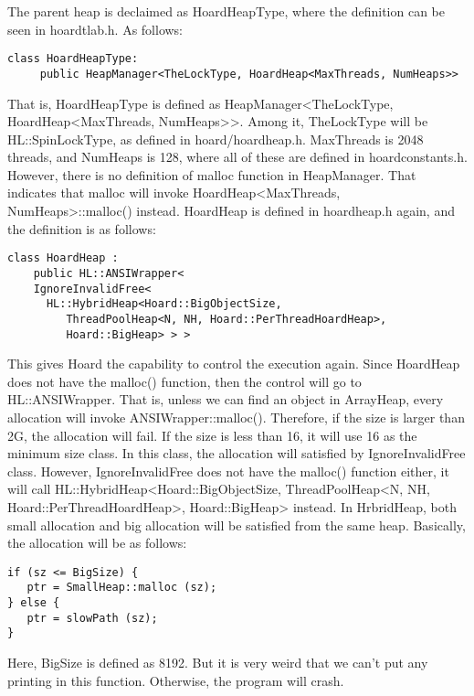 The parent heap is declaimed as HoardHeapType, where the definition can be seen in hoardtlab.h. As follows: \\

\begin{lstlisting}
class HoardHeapType: 
     public HeapManager<TheLockType, HoardHeap<MaxThreads, NumHeaps>> 
\end{lstlisting}

That is, HoardHeapType is defined as HeapManager<TheLockType, HoardHeap<MaxThreads, NumHeaps>>. Among it, TheLockType will be HL::SpinLockType, as defined in hoard/hoardheap.h. MaxThreads is 2048 threads, and NumHeaps is 128, where all of these are defined in hoardconstants.h. However, there is no definition of malloc function in HeapManager. That indicates that malloc will invoke HoardHeap<MaxThreads, NumHeaps>::malloc() instead. 
HoardHeap is defined in hoardheap.h again, and the definition is as follows: 
\begin{lstlisting}
class HoardHeap :
    public HL::ANSIWrapper<
    IgnoreInvalidFree<
      HL::HybridHeap<Hoard::BigObjectSize,
         ThreadPoolHeap<N, NH, Hoard::PerThreadHoardHeap>,
         Hoard::BigHeap> > > 	
\end{lstlisting}


This gives Hoard the capability to control the execution again. Since HoardHeap does not have the malloc() function, then the control will go to HL::ANSIWrapper. That is, unless we can find an object in ArrayHeap, every allocation will invoke ANSIWrapper::malloc(). Therefore, if the size is larger than 2G, the allocation will fail. If the size is less than 16, it will use 16 as the minimum size class. In this class, the allocation will satisfied by IgnoreInvalidFree class. However, IgnoreInvalidFree does not have the malloc() function either, it will call HL::HybridHeap<Hoard::BigObjectSize,
         ThreadPoolHeap<N, NH, Hoard::PerThreadHoardHeap>,
         Hoard::BigHeap> instead. In HrbridHeap, both small allocation and big allocation will be satisfied from the same heap. 
         Basically, the allocation will be as follows:
         
\begin{lstlisting}
if (sz <= BigSize) {
   ptr = SmallHeap::malloc (sz);
} else {
   ptr = slowPath (sz);
}
\end{lstlisting}

Here, BigSize is defined as 8192. But it is very weird that we can't put any printing in this function. Otherwise, the program will crash. 

